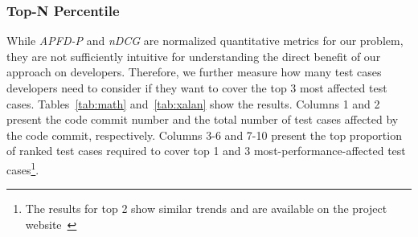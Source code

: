 \subsubsection{Top-N Percentile}

While \textit{APFD-P} and \textit{nDCG} are normalized quantitative metrics for our problem, they are not sufficiently intuitive for understanding the direct benefit of our approach on developers. Therefore, we further measure how many test cases developers need to consider if they want to cover the top 3 most affected test cases. Tables~\ref{tab:math} and~\ref{tab:xalan} show the results. Columns 1 and 2 present the code commit number and the total number of test cases affected by the code commit, respectively. Columns 3-6 and 7-10 present the top proportion of ranked test cases required to cover top 1 and 3 most-performance-affected test cases\footnote{The results for top 2 show similar trends and are available on the project website~\cite{perfranker}}. 





